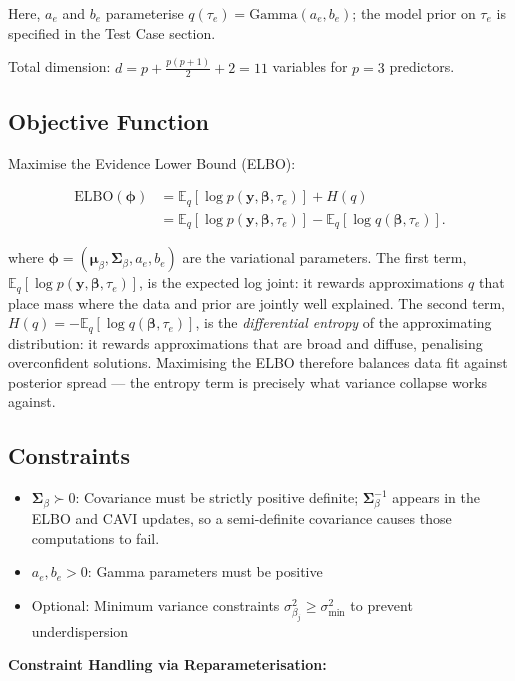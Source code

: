 \documentclass[11pt,a4paper]{article}
\newcommand{\E}{\mathbb{E}}
\newcommand{\ELBO}{\text{ELBO}}
\begin{document}
Here, $a_e$ and $b_e$ parameterise $q(\tau_e)=\mathrm{Gamma}(a_e,b_e)$; 
the model prior on $\tau_e$ is specified in the Test Case section.  \vspace{1em} 

Total dimension: $d = p + \frac{p(p+1)}{2} + 2 = 11$ variables for $p=3$ predictors.

\subsection*{Objective Function}

Maximise the Evidence Lower Bound (ELBO):

\begin{align}
\ELBO(\bm{\phi})
&= \E_q[\log p(\bm{y}, \bm{\beta}, \tau_e)] + H(q) \\
&= \E_q[\log p(\bm{y}, \bm{\beta}, \tau_e)] - \E_q[\log q(\bm{\beta}, \tau_e)] .
\end{align}

where $\bm{\phi} = (\bm{\mu}_\beta, \bm{\Sigma}_\beta, a_e, b_e)$ are the variational parameters.
The first term, $\E_q[\log p(\bm{y}, \bm{\beta}, \tau_e)]$, is the expected log joint: it rewards approximations $q$ that place mass where the data and prior are jointly well explained.
The second term, $H(q) = -\E_q[\log q(\bm{\beta}, \tau_e)]$, is the \emph{differential entropy} of the approximating distribution: it rewards approximations that are broad and diffuse, penalising overconfident solutions.
Maximising the ELBO therefore balances data fit against posterior spread --- the entropy term is precisely what variance collapse works against.

\subsection*{Constraints}

\begin{itemize}
\item $\bm{\Sigma}_\beta \succ 0$: Covariance must be strictly positive definite; $\bm{\Sigma}_\beta^{-1}$ appears in the ELBO and CAVI updates, so a semi-definite covariance causes those computations to fail.
\item $a_e, b_e > 0$: Gamma parameters must be positive
\item Optional: Minimum variance constraints $\sigma^2_{\beta_j} \geq \sigma^2_{\text{min}}$ to prevent underdispersion
\end{itemize}

\textbf{Constraint Handling via Reparameterisation:}
\end{document}
